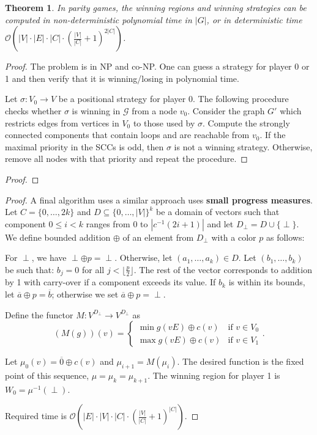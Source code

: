 \documentclass{article}
\newtheorem{theorem}{Theorem}
\begin{document}
\begin{theorem}
	 In parity games, the winning regions and winning strategies can be computed in non-deterministic polynomial time in $|G|$, or in deterministic time $\mathcal{O}\left(|V| \cdot |E| \cdot |C| \cdot (\frac{|V|}{|C|} + 1)^{2|C|}\right)$.
\end{theorem}
\begin{proof}
	The problem is in NP and co-NP. One can guess a strategy for player 0 or 1 and then verify that it is winning/losing in polynomial time.
	
	Let $\sigma : V_0 \rightarrow V$ be a positional strategy for player 0. The following procedure checks whether $\sigma$ is winning in $\mathcal{G}$ from a node $v_0$. Consider the graph $G'$ which restricts edges from vertices in $V_0$ to those used by $\sigma$. Compute the strongly connected components that contain loops and are reachable from $v_0$. If the maximal priority in the SCCs is odd, then $\sigma$ is not a winning strategy. Otherwise, remove all nodes with that priority and repeat the procedure.
\end{proof}
\begin{proof}
\end{proof}
\begin{proof}
	A final algorithm uses a similar approach uses \textbf{small progress measures}. Let $C = \{0, \dots, 2k\}$ and $D \subseteq \{ 0, \dots, |V| \}^k$ be a domain of vectors such that component $0 \leq i < k$ ranges from $0$ to $|c^{-1}(2i+1)|$ and let $D_\perp = D \cup \{\perp\}$. We define bounded addition $\oplus$ of an element from $D_\perp$ with a color $p$ as follows:
	
	For $\perp$, we have $\perp \oplus p = \perp$. Otherwise, let $(a_1, \dots, a_k) \in D$. Let $(b_1, \dots, b_k)$ be such that: $b_j = 0$ for all $j < \lfloor \frac{p}{2} \rfloor$. The rest of the vector corresponds to addition by 1 with carry-over if a component exceeds its value. If $b_k$ is within its bounds, let $\overline{a} \oplus p = \overline{b}$; otherwise we set $\overline{a} \oplus p = \perp$.
	
	Define the functor $M : V^{D_\perp} \rightarrow V^{D_\perp}$ as
	$$ (M(g))(v) = \begin{cases}
		\min g(vE) \oplus c(v) & \text{if } v \in V_0 \\
		\max g(vE) \oplus c(v) & \text{if } v \in V_1
	\end{cases}. $$
	
	Let $\mu_0(v) = \overline{0} \oplus c(v)$ and $\mu_{i+1} = M(\mu_i)$. The desired function is the fixed point of this sequence, $\mu = \mu_k = \mu_{k+1}$. The winning region for player 1 is $W_0 = \mu^{-1}(\perp)$. 
	
	Required time is $\mathcal{O}\left(|E| \cdot |V| \cdot |C| \cdot (\frac{|V|}{|C|} + 1)^{|C|}\right)$.
\end{proof}
\end{document}
